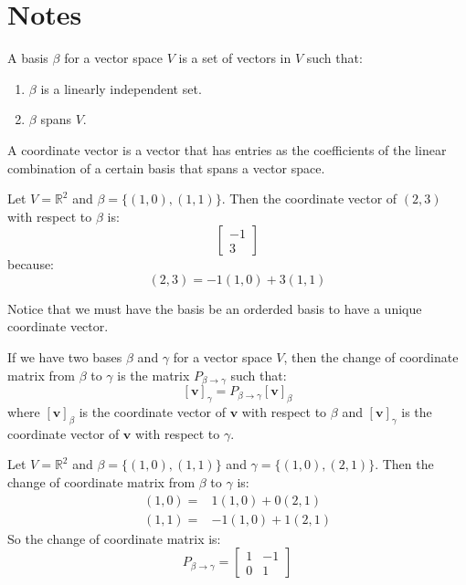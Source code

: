 \section{Notes}
\begin{definition}[Basis]
    A basis $\beta$ for a vector space $V$ is a set of vectors in $V$ such that:
    \begin{enumerate}
        \item $\beta$ is a linearly independent set.
        \item $\beta$ spans $V$.
    \end{enumerate}
\end{definition}
\begin{definition}
    A coordinate vector is a vector that has entries as the coefficients of the linear combination of a certain basis that spans a vector space.
    \begin{example}
        Let $V = \mathbb{R}^2$ and $\beta = \{(1,0),(1, 1)\}$. Then the coordinate vector of $(2,3)$ with respect to $\beta$ is:
        \[
            \begin{bmatrix}
                -1 \\
                3
            \end{bmatrix}
        \]
        because:
        \[
            (2,3) = -1(1,0) + 3(1,1)
        \]
    \end{example}
    Notice that we must have the basis be an orderded basis to have a unique coordinate vector.
\end{definition}
\begin{definition}
    If we have two bases $\beta$ and $\gamma$ for a vector space $V$, then the change of coordinate matrix from $\beta$ to $\gamma$ is the matrix $P_{\beta \to \gamma}$ such that:
    \[
        [\mathbf{v}]_{\gamma} = P_{\beta \to \gamma}[\mathbf{v}]_{\beta}
    \]
    where $[\mathbf{v}]_{\beta}$ is the coordinate vector of $\mathbf{v}$ with respect to $\beta$ and $[\mathbf{v}]_{\gamma}$ is the coordinate vector of $\mathbf{v}$ with respect to $\gamma$.
    \begin{example}
        Let $V = \mathbb{R}^2$ and $\beta = \{(1,0),(1, 1)\}$ and $\gamma = \{(1,0),(2,1)\}$. Then the change of coordinate matrix from $\beta$ to $\gamma$ is:
        \begin{align*}
            (1,0) = & 1(1,0) + 0(2,1) \\
            (1,1) = & -1(1,0) + 1(2,1)
        \end{align*}
        So the change of coordinate matrix is:
        \[
            P_{\beta \to \gamma} = \begin{bmatrix}
                1 & -1 \\
                0 & 1
            \end{bmatrix}
        \]
    \end{example}
\end{definition}
